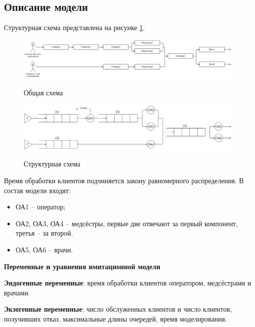\subsection{Описание модели}
Структурная схема представлена на рисунке \ref{fig1:image}.

\begin{figure}[h]
	\begin{center}
		{\includegraphics[scale = 0.37]{img/struct.png}}
		\caption{Общая схема}
		\label{fig1:image}
	\end{center}
\end{figure}

\begin{figure}[h]
	\begin{center}
		{\includegraphics[scale = 0.37]{img/schema.png}}
		\caption{Структурная схема}
		\label{fig2:image}
	\end{center}
\end{figure}

\newpage


Время обработки клиентов подчиняется закону равномерного распределения. 
%
В состав модели входят: 
%
\begin{itemize}
	\item ОА1 -- оператор;
	
	\item ОА2, ОА3, ОА4 -- медсёстры, первые две отвечают за первый компонент, третья -- за второй.
	
	\item ОА5, ОА6 -- врачи.
\end{itemize}

\textbf{Переменные и уравнения имитационной модели}  

\textbf{Эндогенные переменные}: время обработки клиентов оператором, медсёстрами и врачами.

\textbf{Экзогенные переменные}: число обслуженных клиентов и число клиентов, получивших отказ, максимальные длины очередей, время моделирования.

